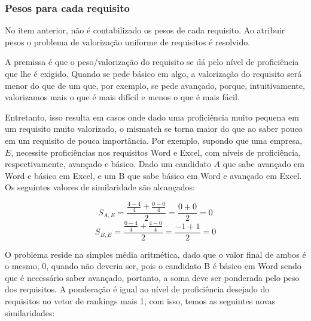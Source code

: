 \documentclass[preprint,12pt]{elsarticle}
\begin{document}
\subsubsection{Pesos para cada requisito}
\label{sssec:weights}
No item anterior, não é contabilizado os pesos de cada requisito. Ao atribuir pesos o problema de valorização uniforme de requisitos é resolvido.

   
A premissa é que o peso/valorização do requisito se dá pelo nível de proficiência que lhe é exigido. Quando se pede básico em algo, a valorização do requisito será menor do que de um que, por exemplo, se pede avançado, porque, intuitivamente, valorizamos mais o que é mais difícil e menos o que é mais fácil.

Entretanto, isso resulta em casos onde dado uma proficiência muito pequena em um requisito muito valorizado, o mismatch se torna maior do que ao saber pouco em um requisito de pouca importância. Por exemplo, supondo que uma empresa, $E$, necessite proficiências nos requisitos Word e Excel, com níveis de proficiência, respectivamente, avançado e básico. Dado um candidato $A$ que sabe avançado em Word e básico em Excel, e um B que sabe básico em Word e avançado em Excel. Os seguintes valores de similaridade são alcançados:

$$ S_{A,E} = \frac{\tfrac{4 - 4}{4} + \tfrac{0 - 0}{4}}{2} = \frac{0 + 0}{2} =  0 $$
$$ S_{B,E} = \frac{\tfrac{0 - 4}{4} + \tfrac{4 - 0}{4}}{2} = \frac{-1 + 1}{2} =  0 $$

O problema reside na simples média aritmética, dado que o valor final de ambos é o mesmo, 0, quando não deveria ser, pois o candidato B é básico em Word sendo que é necessário saber avançado, portanto, a soma deve ser ponderada pelo peso dos requisitos. A ponderação é igual ao nível de proficiência desejado do requisitos no vetor de rankings mais 1, com isso, temos as seguintes novas similaridades:
\end{document}
